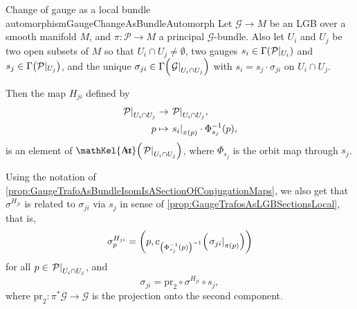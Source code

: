 \documentclass[reqno,a4paper,oneside]{amsart}
\theoremstyle{plain}
\theoremstyle{remark}
\theoremstyle{definition}
\DeclareMathOperator{\sAut}{\mathKel{A\mkern-5.5mu u\mkern-4mu t\mkern-1.5mu}}
\begin{document}
\begin{propositions}{Change of gauge as a local bundle automorphism}{GaugeChangeAsBundleAutomorph}
Let $\mathcal{G} \to M$ be an LGB over a smooth manifold $M$, and $\pi\colon\mathcal{P} \to M$ a principal $\mathcal{G}$-bundle. Also let $U_i$ and $U_j$ be two open subsets of $M$ so that $U_i \cap U_j \neq \emptyset$, two gauges $s_i \in \Gamma\mleft(\mathcal{P}|_{U_i}\mright)$ and $s_j \in \Gamma\mleft(\mathcal{P}|_{U_j}\mright)$, and the unique $\sigma_{ji} \in \Gamma\mleft( \mleft.\mathcal{G}\mright|_{U_i \cap U_j} \mright)$ with $s_i = s_j \cdot \sigma_{ji}$ on $U_i \cap U_j$.

Then the map $H_{ji}$ defined by
\begin{align*}
\mleft.\mathcal{P}\mright|_{U_i \cap U_j} &\to \mleft.\mathcal{P}\mright|_{U_i \cap U_j},\\
p &\mapsto \mleft.s_i\mright|_{\pi(p)} \cdot \Phi_{s_j}^{-1}(p),
\end{align*}
is an element of $\sAut\mleft( \mleft.\mathcal{P}\mright|_{U_i \cap U_j} \mright)$,
where $\Phi_{s_j}$ is the orbit map through $s_j$.

Using the notation of \ref{prop:GaugeTrafoAsBundleIsomIsASectionOfConjugationMaps}, we also get that $\sigma^{H_{ji}}$ is related to $\sigma_{ji}$ via $s_j$ in sense of \ref{prop:GaugeTrafosAsLGBSectionsLocal}, that is,
\begin{equation*}
\sigma^{H_{ji}}_p
=
\mleft(p, c_{\mleft(\Phi^{-1}_{s_j}(p)\mright)^{-1}} \mleft( \mleft.\sigma_{ji}\mright|_{\pi(p)} \mright) \mright)
\end{equation*}
for all $p \in \mleft.\mathcal{P}\mright|_{U_i \cap U_j}$, and
\begin{equation*}
\sigma_{ji}
=
\mathrm{pr}_2 \circ \sigma^{H_{ji}} \circ s_j,
\end{equation*}
where $\mathrm{pr}_2\colon \pi^*\mathcal{G} \to \mathcal{G}$ is the projection onto the second component.
\end{propositions}
\end{document}
